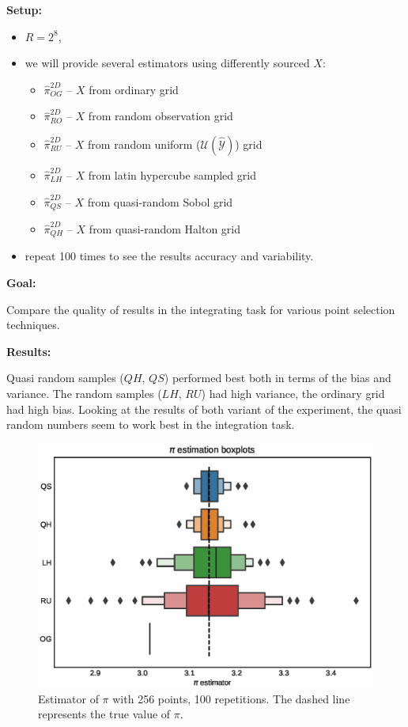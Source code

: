 \documentclass[shortabstract]{iithesis}
\begin{document}
\textbf{Setup:}
\begin{itemize}
    \item $R=2^8$,
    \item we  will provide several estimators using differently sourced $X$:
    \begin{itemize}
        \item $\hat{\pi}^{2D}_{OG}$ -- $X$ from ordinary grid 
        \item $\hat{\pi}^{2D}_{RO}$ -- $X$ from random observation grid 
        \item $\hat{\pi}^{2D}_{RU}$ -- $X$ from random uniform ($\mathcal U (\hat{\mathcal Y})$) grid 
        \item $\hat{\pi}^{2D}_{LH}$ -- $X$ from latin hypercube sampled grid 
        \item $\hat{\pi}^{2D}_{QS}$ -- $X$ from quasi-random Sobol grid 
        \item $\hat{\pi}^{2D}_{QH}$ -- $X$ from quasi-random Halton grid 
    \end{itemize}
    \item repeat 100 times to see the results accuracy and variability.
\end{itemize}

\textbf{Goal:}

Compare the quality of results in the integrating task for various point selection techniques. 

\textbf{Results:}

Quasi random samples ($QH$, $QS$) performed best both in terms of the bias and variance. The random samples ($LH$, $RU$) had high variance, the ordinary grid had high bias.  Looking at the results of both variant of the experiment, the quasi random numbers seem to work best in the integration task.

\begin{figure}[!ht]
    \centering
    \includegraphics[scale=0.65]{pi_example_2d.eps}
    \caption{Estimator of $\pi$ with 256 points, 100 repetitions. The dashed line represents the true value of $\pi$.}
    \label{fig:toy:res}
\end{figure}
\end{document}
